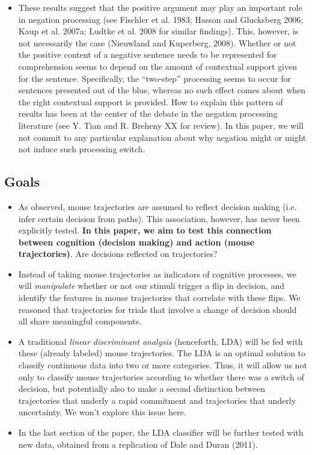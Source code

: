 \documentclass{article}
\newcommand{\addMM}[1]{{\leavevmode\color{red}#1}}
\begin{document}
\begin{itemize}
\begin{itemize}
\item These results suggest that the positive argument may play an important role in negation processing (see Fischler et al. 1983; Hasson and Glucksberg 2006; Kaup et al. 2007a; Ludtke et al. 2008 for similar findings). This, however, is not necessarily the case (Nieuwland and Kuperberg, 2008). 
Whether or not the positive content of a negative sentence needs to be represented for comprehension seems to depend on the amount of contextual support given for the sentence. Specifically, the ``two-step'' processing seems to occur for sentences presented out of the blue, whereas no such effect comes about when the right contextual support is provided.  How to explain this pattern of results has been at the center of the debate in the negation processing literature (see Y. Tian and R. Breheny XX for review). 
In this paper, we will not commit to any particular explanation about why negation might or might not induce such processing switch. 

\end{itemize}

\end{itemize}

\subsection{Goals} 
\begin{itemize}

\item As observed, mouse trajectories are assumed to reflect decision making (i.e. infer certain decision from paths). This association, however, has never been explicitly tested.
\textbf{In this paper, we aim to test this connection between cognition (decision making) and action (mouse trajectories)}. Are decisions reflected on trajectories? 

\item Instead of taking mouse trajectories as indicators of cognitive processes, we will \emph{manipulate} whether or not our stimuli trigger a flip in decision, and identify  the features in mouse trajectories that correlate with these flips. We reasoned that trajectories for trials that involve a change of decision should all share meaningful components. 

\item A traditional \emph{linear discriminant analysis} (henceforth, LDA) will be fed with these (already labeled) mouse trajectories. The LDA is an optimal solution to classify continuous data into two or more categories. Thus, it will allow us not only to classify mouse trajectories according to whether there was a switch of decision, but potentially also to make a second distinction between trajectories that underly a rapid commitment and trajectories that underly uncertainty.  \addMM{We won't explore this issue here}. 

\item In the last section of the paper, the LDA classifier will be further tested with new data, obtained from a replication of Dale and Duran (2011).   
\end{itemize}
\end{document}
